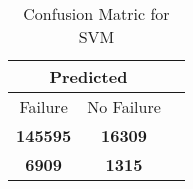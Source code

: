 \begin{table}[] 
\caption{Confusion Matric for SVM} 
\label{Table: Prediction Accuracy-DMDSVMSVMEKF-ignoreReflection-Reflection} 
\centering 
\begin{tabular} 
 {@{}ccc@{}} 
\toprule 
\multicolumn{2}{c}{\textbf{Predicted}}
 \\ \midrule 
\multicolumn{1}{|c|}{Failure} & 
\multicolumn{1}{c|}{No Failure}
 \\ \midrule 
\multicolumn{1}{|c|}{\color{green}\textbf{145595}} & 
\multicolumn{1}{c|}{\color{green}\textbf{16309}}
 \\ \midrule 
\multicolumn{1}{|c|}{\color{red}\textbf{6909}} & 
\multicolumn{1}{c|}{\color{red}\textbf{1315}}
 \\ \bottomrule 
\end{tabular} 
\end{table} 
